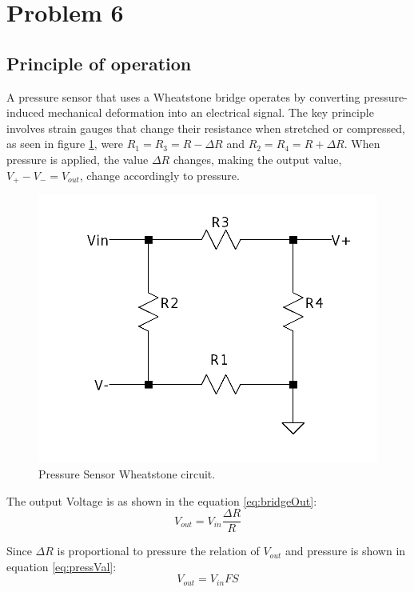 \newpage
\section{Problem 6}
\subsection{Principle of operation}

A pressure sensor that uses a Wheatstone bridge operates by converting pressure-induced mechanical deformation into an electrical signal. The key principle involves strain gauges that change their resistance when stretched or compressed, as seen in figure \ref{fig:pressSens}, were $R_1 = R_3 = R-\Delta R$ and $R_2 = R_4 = R + \Delta R$. When pressure is applied, the value $\Delta R$ changes, making the output value, $V_+ -V_- = V_{out}$, change accordingly to pressure.

\begin{figure}[H]
    \centering
    \includegraphics*[scale = 0.3]{Images/pressureWheatstone.png}
    \caption{Pressure Sensor Wheatstone circuit.}
    \label{fig:pressSens}
\end{figure}

The output Voltage is as shown in the equation \ref{eq:bridgeOut}:
\begin{equation}
    \label{eq:bridgeOut}
    V_{out} = V_{in}\frac{\Delta R}{R}
\end{equation}

Since $\Delta R$ is proportional to pressure the relation of $V_{out}$ and pressure is shown in equation \ref{eq:pressVal}:
\begin{equation}
    \label{eq:pressVal}
    V_{out} = V_{in}FS
\end{equation}

